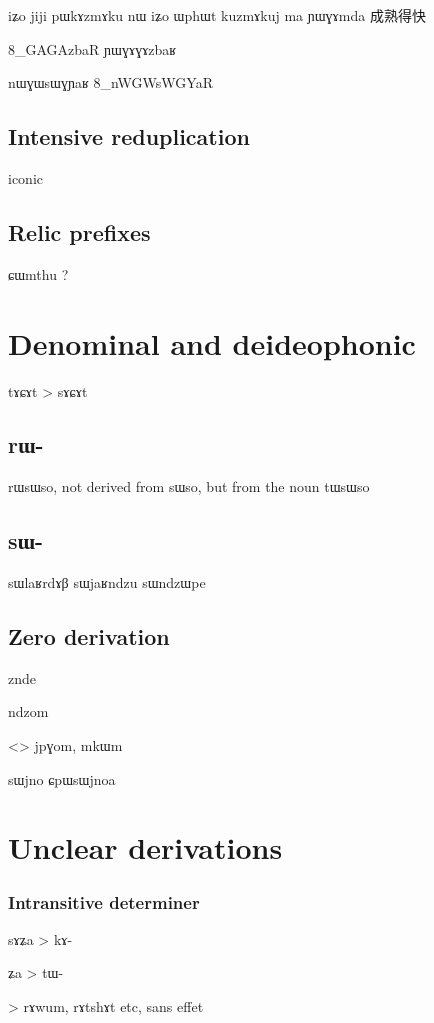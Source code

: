 \documentclass[oldfontcommands,oneside,a4paper,11pt]{memoir}
\begin{document}
iʑo jiji pɯkɤzmɤku nɯ iʑo ɯphɯt kuzmɤkuj ma ɲɯɣɤmda 成熟得快


8_GAGAzbaR
ɲɯɣɤɣɤzbaʁ

nɯɣɯsɯɣɲaʁ
8_nWGWsWGYaR
\subsection{Intensive reduplication} \label{sub:intensive.redp}
iconic

\subsection{Relic prefixes}

ɕɯmthu ?

\section{Denominal and deideophonic} \label{sec:denominal}


tɤɕɤt > sɤɕɤt

\subsection{rɯ-}
rɯsɯso, not derived from sɯso, but from the noun tɯsɯso
\subsection{sɯ-}
sɯlaʁrdɤβ
sɯjaʁndzu
sɯndzɯpe

\subsection{Zero derivation} \label{sub:zero.derivation}


znde

ndzom

<> jpɣom, mkɯm

sɯjno
ɕpɯsɯjnoa

 
\section{Unclear derivations}


\subsubsection{Intransitive determiner}  \label{subsub:intransitive.det}
sɤʑa > kɤ-

ʑa > tɯ-


> rɤwum, rɤtshɤt etc, sans effet
\end{document}
